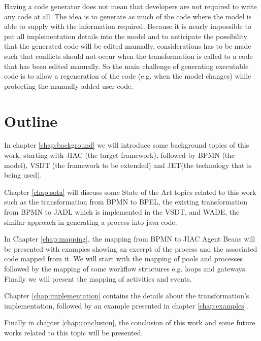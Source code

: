 Having a code generator does not mean that developers are not required to write any code at all. The idea is to generate as much of the code where the model is able to supply with the information required. Because it is nearly impossible to put all implementation details into the model and to anticipate the possibility that the generated code will be edited manually, considerations has to be made such that conflicts should not occur when the transformation is called to a code that has been edited manually. So the main challenge of generating executable code is to allow a regeneration of the code (e.g. when the model changes) while protecting the manually added user code. 


\section{Outline}
In chapter \ref{chap:background} we will introduce some background topics of this work, starting with JIAC (the target framework), followed by BPMN (the model), VSDT (the framework to be extended) and JET(the technology that is being used).

Chapter \ref{chap:sota} will discuss some State of the Art topics related to this work such as the transformation from BPMN to BPEL, the existing transformation from BPMN to JADL which is implemented in the VSDT, and WADE, the similar approach in generating a process into java code.

In Chapter \ref{chap:mapping}, the mapping from BPMN to JIAC Agent Beans will be presented with examples showing an excerpt of the process and the associated code mapped from it. We will start with the mapping of pools and processes followed by the mapping of some workflow structures e.g. loops and gateways. Finally we will present the mapping of activities and events.

Chapter \ref{chap:implementation} contains the details about the transformation's implementation, followed by an example presented in chapter \ref{chap:examples}. 

Finally in chapter \ref{chap:conclusion}, the conclusion of this work and some future works related to this topic will be presented.
